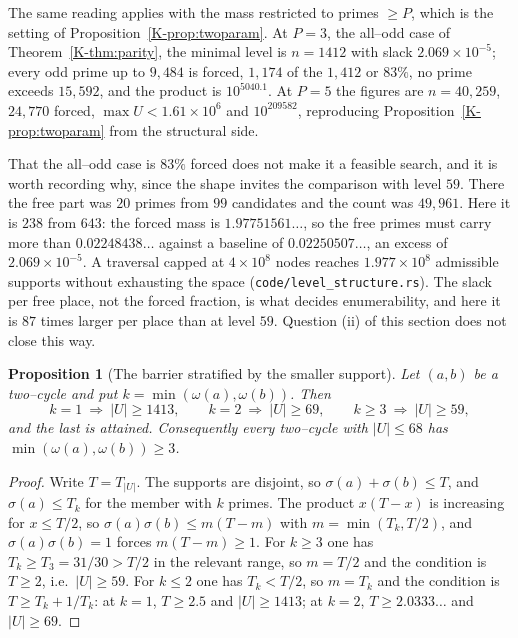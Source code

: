 \documentclass[11pt]{article}
\newtheorem{proposition}[theorem]{Proposition}
\theoremstyle{definition}
\begin{document}
The same reading applies with the mass restricted to primes $\ge P$, which is the setting of
Proposition~\ref{K-prop:twoparam}. At $P=3$, the all--odd case of Theorem~\ref{K-thm:parity}, the
minimal level is $n=1412$ with slack $2.069\times10^{-5}$; every odd prime up to $9{,}484$ is forced,
$1{,}174$ of the $1{,}412$ or $83\%$, no prime exceeds $15{,}592$, and the product is $10^{5040.1}$.
At $P=5$ the figures are $n=40{,}259$, $24{,}770$ forced, $\max U<1.61\times10^{6}$ and $10^{209582}$,
reproducing Proposition~\ref{K-prop:twoparam} from the structural side.

That the all--odd case is $83\%$ forced does not make it a feasible search, and it is worth
recording why, since the shape invites the comparison with level $59$. There the free part was $20$
primes from $99$ candidates and the count was $49{,}961$. Here it is $238$ from $643$: the forced
mass is $1.97751561\ldots$, so the free primes must carry more than $0.02248438\ldots$ against a
baseline of $0.02250507\ldots$, an excess of $2.069\times10^{-5}$. A traversal capped at
$4\times10^{8}$ nodes reaches $1.977\times10^{8}$ admissible supports without exhausting the space
\textup{(\texttt{code/level\_structure.rs})}. The slack per free place, not the forced fraction, is
what decides enumerability, and here it is $87$ times larger per place than at level $59$. Question
(ii) of this section does not close this way.

\begin{proposition}[The barrier stratified by the smaller support]\label{prop:split}
Let $(a,b)$ be a two--cycle and put $k=\min(\omega(a),\omega(b))$. Then
\[ k=1\ \Rightarrow\ |U|\ge1413, \qquad k=2\ \Rightarrow\ |U|\ge69, \qquad
   k\ge3\ \Rightarrow\ |U|\ge59, \]
and the last is attained. Consequently every two--cycle with $|U|\le68$ has
$\min(\omega(a),\omega(b))\ge3$.
\end{proposition}
\begin{proof}
Write $T=T_{|U|}$. The supports are disjoint, so $\sigma(a)+\sigma(b)\le T$, and
$\sigma(a)\le T_k$ for the member with $k$ primes. The product $x(T-x)$ is increasing for
$x\le T/2$, so $\sigma(a)\sigma(b)\le m(T-m)$ with $m=\min(T_k,T/2)$, and $\sigma(a)\sigma(b)=1$
forces $m(T-m)\ge1$. For $k\ge3$ one has $T_k\ge T_3=31/30>T/2$ in the relevant range, so $m=T/2$
and the condition is $T\ge2$, i.e.\ $|U|\ge59$. For $k\le2$ one has $T_k<T/2$, so $m=T_k$ and the
condition is $T\ge T_k+1/T_k$: at $k=1$, $T\ge2.5$ and $|U|\ge1413$; at $k=2$, $T\ge2.0333\ldots$ and
$|U|\ge69$.
\end{proof}
\end{document}
